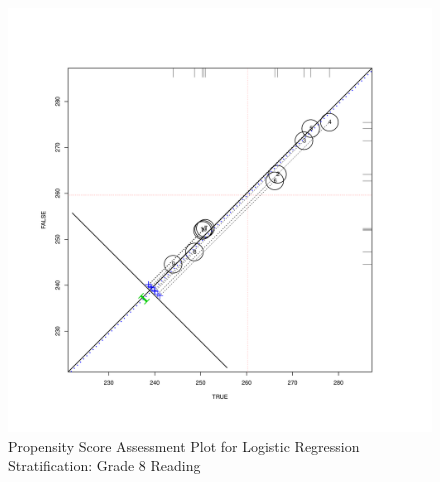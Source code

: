 \documentclass[letterpaper,12p,twoside]{article} %
\begin{document}
\clearpage
\begin{figure}[h!]
\begin{center}
\includegraphics[height=.4\textheight,width=.4\textheight]{../Figures2009/g8read-circpsa10.pdf}
\caption{Propensity Score Assessment Plot for Logistic Regression Stratification: Grade 8 Reading}
\end{center}
\end{figure}


\end{document}
